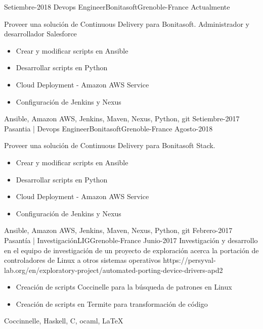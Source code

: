 \begin{experiences}
  \experience
    {Setiembre-2018}   {Devops Engineer}{Bonitasoft}{Grenoble-France}
    {Actualmente}
                    {Proveer una solución de Continuous Delivery para Bonitasoft. Administrador y desarrollador Salesforce
                    \begin{itemize}
                        \item Crear y modificar scripts en Ansible
                        \item Desarrollar scripts en Python
                        \item Cloud Deployment - Amazon AWS Service
                        \item Configuración de Jenkins y Nexus
                      \end{itemize}}
                    {Ansible, Amazon AWS, Jenkins, Maven, Nexus, Python, git}
  \emptySeparator
  \experience
    {Setiembre-2017}   {Pasantia | Devops Engineer}{Bonitasoft}{Grenoble-France}
    {Agosto-2018}
                    {Proveer una solución de Continuous Delivery para Bonitasoft Stack.
                    \begin{itemize}
                        \item Crear y modificar scripts en Ansible
                        \item Desarrollar scripts en Python
                        \item Cloud Deployment - Amazon AWS Service
                        \item Configuración de Jenkins y Nexus
                      \end{itemize}}
                    {Ansible, Amazon AWS, Jenkins, Maven, Nexus, Python, git}
  \emptySeparator
    \projectexperiences
    {Febrero-2017}   {Pasantía | Investigación}{LIG}{Grenoble-France}
    {Junio-2017}
                    {
                    Investigación y desarrollo en el equipo de investigación de un proyecto
                    de exploración acerca la portación de controladores de Linux a otros sistemas
                    operativos \tiny{https://persyval-lab.org/en/exploratory-project/automated-porting-device-drivers-apd2}
                    }
                    {
                    \begin{itemize}
                        \item Creación de scripts Coccinelle para la búsqueda de patrones en Linux
                        \item Creación de scripts en Termite para transformación de código
                      \end{itemize}
                     }
                    {Coccinnelle, Haskell, C, ocaml, \LaTeX}
  \emptySeparator


\end{experiences}
